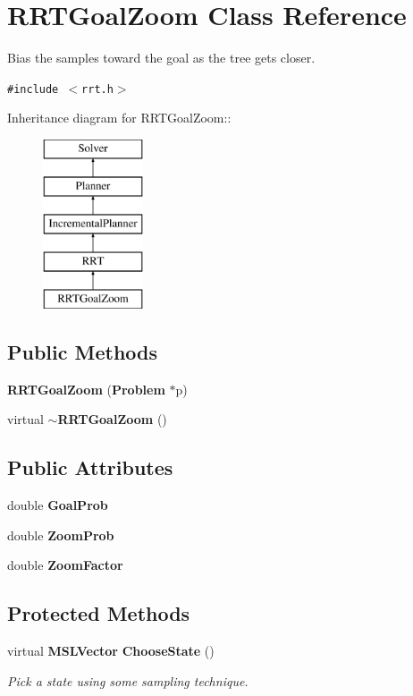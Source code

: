 \section{RRTGoal\-Zoom  Class Reference}
\label{class_RRTGoalZoom}
Bias the samples toward the goal as the tree gets closer. 


{\tt \#include $<$rrt.h$>$}

Inheritance diagram for RRTGoal\-Zoom::\begin{figure}[H]
\begin{center}
\leavevmode
\includegraphics[height=5cm]{class_RRTGoalZoom}
\end{center}
\end{figure}
\subsection*{Public Methods}
\begin{CompactItemize}
\item 
{\bf RRTGoal\-Zoom} ({\bf Problem} $\ast$p)
\item 
virtual {\bf $\sim$RRTGoal\-Zoom} ()
\end{CompactItemize}
\subsection*{Public Attributes}
\begin{CompactItemize}
\item 
double {\bf Goal\-Prob}
\item 
double {\bf Zoom\-Prob}
\item 
double {\bf Zoom\-Factor}
\end{CompactItemize}
\subsection*{Protected Methods}
\begin{CompactItemize}
\item 
virtual {\bf MSLVector} {\bf Choose\-State} ()
\begin{CompactList}\small\item\em Pick a state using some sampling technique.\item\end{CompactList}\end{CompactItemize}


